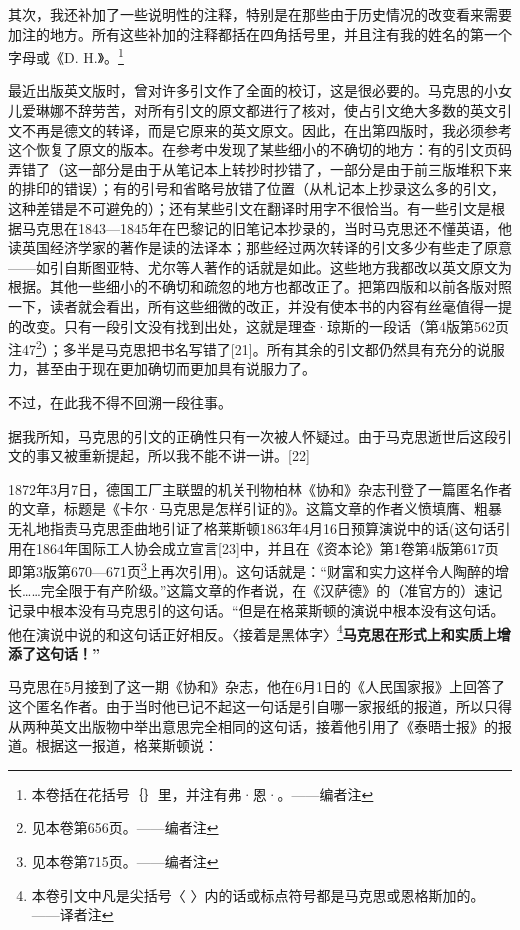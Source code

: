 \documentclass{ctexbook}
\begin{document}
其次，我还补加了一些说明性的注释，特别是在那些由于历史情况的改变看来需要加注的地方。所有这些补加的注释都括在四角括号里，并且注有我的姓名的第一个字母或《D. H.》。\footnote{本卷括在花括号｛｝里，并注有弗·恩·。——编者注}

最近出版英文版时，曾对许多引文作了全面的校订，这是很必要的。马克思的小女儿爱琳娜不辞劳苦，对所有引文的原文都进行了核对，使占引文绝大多数的英文引文不再是德文的转译，而是它原来的英文原文。因此，在出第四版时，我必须参考这个恢复了原文的版本。在参考中发现了某些细小的不确切的地方：有的引文页码弄错了（这一部分是由于从笔记本上转抄时抄错了，一部分是由于前三版堆积下来的排印的错误）；有的引号和省略号放错了位置（从札记本上抄录这么多的引文，这种差错是不可避免的）；还有某些引文在翻译时用字不很恰当。有一些引文是根据马克思在1843—1845年在巴黎记的旧笔记本抄录的，当时马克思还不懂英语，他读英国经济学家的著作是读的法译本；那些经过两次转译的引文多少有些走了原意——如引自斯图亚特、尤尔等人著作的话就是如此。这些地方我都改以英文原文为根据。其他一些细小的不确切和疏忽的地方也都改正了。把第四版和以前各版对照一下，读者就会看出，所有这些细微的改正，并没有使本书的内容有丝毫值得一提的改变。只有一段引文没有找到出处，这就是理查·琼斯的一段话（第4版第562页注47\footnote{见本卷第656页。——编者注}）；多半是马克思把书名写错了[21]。所有其余的引文都仍然具有充分的说服力，甚至由于现在更加确切而更加具有说服力了。

不过，在此我不得不回溯一段往事。

据我所知，马克思的引文的正确性只有一次被人怀疑过。由于马克思逝世后这段引文的事又被重新提起，所以我不能不讲一讲。[22]

1872年3月7日，德国工厂主联盟的机关刊物柏林《协和》杂志刊登了一篇匿名作者的文章，标题是《卡尔·马克思是怎样引证的》。这篇文章的作者义愤填膺、粗暴无礼地指责马克思歪曲地引证了格莱斯顿1863年4月16日预算演说中的话(这句话引用在1864年国际工人协会成立宣言[23]中，并且在《资本论》第1卷第4版第617页即第3版第670—671页\footnote{见本卷第715页。——编者注}上再次引用)。这句话就是：“财富和实力这样令人陶醉的增长……完全限于有产阶级。”这篇文章的作者说，在《汉萨德》的（准官方的）速记记录中根本没有马克思引的这句话。“但是在格莱斯顿的演说中根本没有这句话。他在演说中说的和这句话正好相反。〈接着是黑体字〉\footnote{本卷引文中凡是尖括号〈 〉内的话或标点符号都是马克思或恩格斯加的。——译者注}\textbf{马克思在形式上和实质上增添了这句话！”}

马克思在5月接到了这一期《协和》杂志，他在6月1日的《人民国家报》上回答了这个匿名作者。由于当时他已记不起这一句话是引自哪一家报纸的报道，所以只得从两种英文出版物中举出意思完全相同的这句话，接着他引用了《泰晤士报》的报道。根据这一报道，格莱斯顿说：
\end{document}
